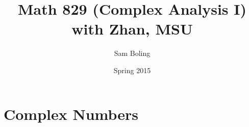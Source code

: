 \documentclass{report}
\title{Math 829 (Complex Analysis I) with Zhan, MSU}
\author{Sam Boling}
\date{Spring 2015}
\begin{document}
\maketitle

\chapter{Complex Numbers}


\end{document}

